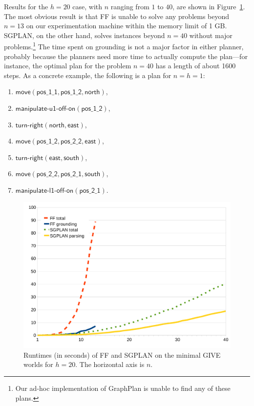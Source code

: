 Results for the $h=20$ case, with $n$ ranging from $1$ to $40$, are
shown in Figure~\ref{fig:give-runtime-minimal}.  The most obvious
result is that FF is unable to solve any problems beyond $n=13$ on our
experimentation machine within the memory limit of 1 GB.  SGPLAN, on
the other hand, solves instances beyond $n=40$ without major
problems.\footnote{Our ad-hoc implementation of GraphPlan is unable to
  find any of these plans.}  The time spent on grounding is not a
major factor in either planner, probably because the planners need
more time to actually compute the plan---for instance, the optimal
plan for the problem $n=40$ has a length of about 1600 steps.  As a
concrete example, the following is a plan for $n=h=1$:

\begin{enumerate}
\item $\mathsf{move}(\mathsf{pos\_1\_1},\mathsf{pos\_1\_2}, \mathsf{north})$,
\item $\mathsf{manipulate}\textsf{-}\mathsf{u1}\textsf{-}\mathsf{off}\textsf{-}\mathsf{on}(\mathsf{pos\_1\_2})$,
\item $\mathsf{turn}\textsf{-}\mathsf{right}(\mathsf{north}, \mathsf{east})$,
\item $\mathsf{move}(\mathsf{pos\_1\_2}, \mathsf{pos\_2\_2},
  \mathsf{east})$,
\item $\mathsf{turn}\textsf{-}\mathsf{right}(\mathsf{east}, \mathsf{south})$,
\item $\mathsf{move}(\mathsf{pos\_2\_2}, \mathsf{pos\_2\_1}, \mathsf{south})$,
\item $\mathsf{manipulate}\textsf{-}\mathsf{l1}\textsf{-}\mathsf{off}\textsf{-}\mathsf{on}(\mathsf{pos\_2\_1})$.
\end{enumerate}




\begin{figure}
  \centering
  \includegraphics[width=1\columnwidth]{graph-exp2}
  \caption{Runtimes (in seconds) of FF and SGPLAN on the minimal GIVE
    worlds for $h=20$. The horizontal axis is $n$.}
  \label{fig:give-runtime-minimal}
\end{figure}


